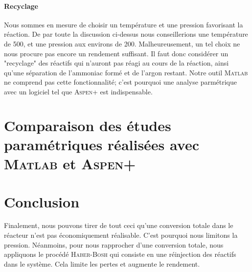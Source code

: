 \documentclass[11pt,a4paper]{report}
\begin{document}
\paragraph{Recyclage} Nous sommes en mesure de choisir un température et une pression favorisant la réaction. De par 
toute la discussion ci-dessus nous conseillerions une température de \unit{500}{\celsius}, et une pression aux environs de \unit{200}{\bbar}. 
Malheureusement, un tel choix ne nous procure  pas encore un rendement suffisant. Il faut donc considérer un 
"recyclage" des réactifs qui n'auront pas réagi au cours de la réaction, ainsi qu'une séparation de l'ammoniac 
formé et de l'argon restant. Notre outil \textsc{Matlab} ne comprend pas cette fonctionnalité; c'est pourquoi une
analyse parmétrique avec un logiciel tel que \textsc{Aspen+} est indispensable.

\section{Comparaison des études paramétriques réalisées avec \textsc{Matlab} et \textsc{Aspen+}}

\section{Conclusion} Finalement, nous pouvons tirer de tout ceci qu'une conversion totale dans le réacteur n'est
pas économiquement réalisable. C'est pourquoi nous limitons la pression. Néanmoins, pour nous rapprocher d'une 
conversion totale, nous appliquons le procédé \textsc{Haber-Bosh} qui consiste en une réinjection des réactifs dans le système. 
Cela limite les pertes et augmente le rendement.
\end{document}
